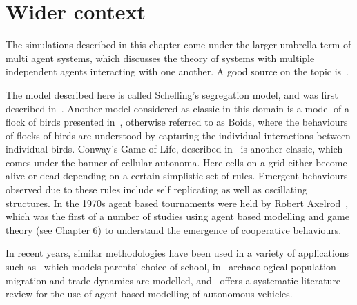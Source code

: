 \section{Wider context}\label{sec:agent_based_simulation_wider_context}

The simulations described in this chapter come under the larger umbrella term of
multi agent systems, which discusses the theory of systems with multiple
independent agents interacting with one another. A good source on the topic
is~\cite{shoham2008multiagent}.

The model described here is called Schelling's segregation model, and was
first described in~\cite{schelling2006micromotives}. Another model
considered as classic in this domain is a model of a flock of birds presented
in~\cite{reynolds1987flocks}, otherwise referred to as Boids, where the
behaviours of flocks of birds are understood by capturing the individual
interactions between individual birds. Conway's Game of Life, described
in~\cite{gardener1970mathematical} is another classic, which comes under
the banner of cellular autonoma. Here cells on a grid either become alive or dead
depending on a certain simplistic set of rules. Emergent behaviours observed due
to these rules include self replicating as well as oscillating structures.
In the 1970s agent based tournaments were held by Robert
Axelrod~\cite{axelrod1990evolution},
which was the first of a number of studies
using agent based modelling and game theory (see Chapter 6) to understand the
emergence of cooperative behaviours.

In recent years, similar methodologies have been used in a variety of
applications such as~\cite{diaz2021agent} which models parents' choice of school,
in~\cite{romanowska2019agent} archaeological population migration and trade
dynamics are modelled, and~\cite{jing2020agent} offers a systematic
literature review for the use of agent based modelling of autonomous vehicles.

